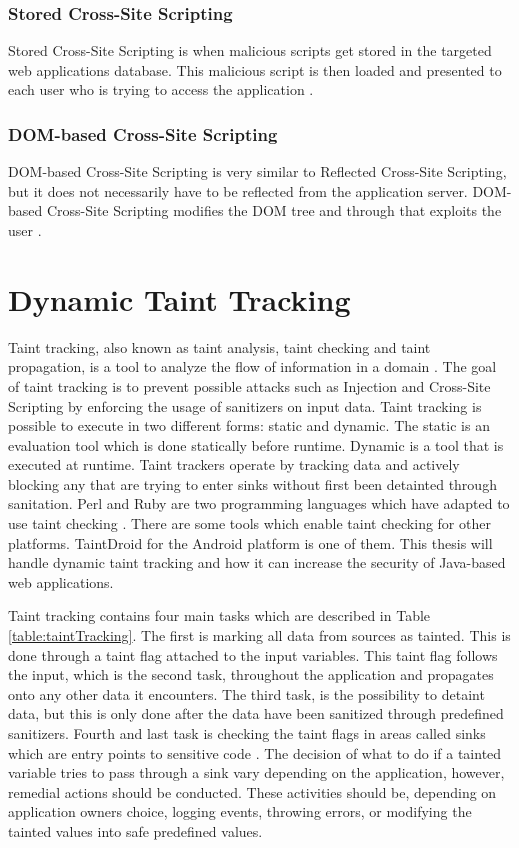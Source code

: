 \subsubsection{Stored Cross-Site Scripting}
Stored Cross-Site Scripting is when malicious scripts get stored in the targeted web applications database. This malicious script is then loaded and presented to each user who is trying to access the application \parencite{Secure_Web}.



\subsubsection{DOM-based Cross-Site Scripting}
DOM-based Cross-Site Scripting is very similar to Reflected Cross-Site Scripting, but it does not necessarily have to be reflected from the application server. DOM-based Cross-Site Scripting modifies the DOM tree and through that exploits the user \parencite{Secure_Web}.



\section{Dynamic Taint Tracking}
\label{DynamicTaintTracking}
Taint tracking, also known as taint analysis, taint checking and taint propagation, is a tool to analyze the flow of information in a domain \parencite{Pan2015}. The goal of taint tracking is to prevent possible attacks such as Injection and Cross-Site Scripting by enforcing the usage of sanitizers on input data. Taint tracking is possible to execute in two different forms: static and dynamic. The static is an evaluation tool which is done statically before runtime. Dynamic is a tool that is executed at runtime. Taint trackers operate by tracking data and actively blocking any that are trying to enter sinks without first been detainted through sanitation. Perl and Ruby are two programming languages which have adapted to use taint checking \parencite{perl, ruby}. There are some tools which enable taint checking for other platforms. TaintDroid \parencite{Ma2010} for the Android platform is one of them. This thesis will handle dynamic taint tracking and how it can increase the security of Java-based web applications.

Taint tracking contains four main tasks which are described in Table \ref{table:taintTracking}. The first is marking all data from sources as tainted. This is done through a taint flag attached to the input variables. This taint flag follows the input, which is the second task, throughout the application and propagates onto any other data it encounters. The third task, is the possibility to detaint data, but this is only done after the data have been sanitized through predefined sanitizers. Fourth and last task is checking the taint flags in areas called sinks which are entry points to sensitive code \parencite{Pan2015, Venkataramani2008}. The decision of what to do if a tainted variable tries to pass through a sink vary depending on the application, however, remedial actions should be conducted. These activities should be, depending on application owners choice, logging events, throwing errors, or modifying the tainted values into safe predefined values. 

